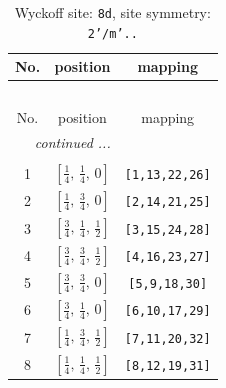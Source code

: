 \documentclass[fleqn,8pt]{jsarticle}
\begin{document}
\begin{longtable}{ccc}
\caption{Wyckoff site: {\tt 8d}, site symmetry: {\tt 2'/m'..}}
 \\
 \hline \hline
No. & position & mapping \\ \hline \endfirsthead

\multicolumn{2}{l}{\tablename\ \thetable{}} \\
 \hline \hline
No. & position & mapping \\ \hline \endhead

 \hline \hline
\multicolumn{2}{r}{\footnotesize\it continued ...} \\ \endfoot

 \hline \hline
\multicolumn{2}{r}{} \\ \endlastfoot

1 & $\left[ \frac{1}{4},\, \frac{1}{4},\, 0 \right]$ & {\tt [1,13,22,26]} \\ \hline
2 & $\left[ \frac{1}{4},\, \frac{3}{4},\, 0 \right]$ & {\tt [2,14,21,25]} \\ \hline
3 & $\left[ \frac{3}{4},\, \frac{1}{4},\, \frac{1}{2} \right]$ & {\tt [3,15,24,28]} \\ \hline
4 & $\left[ \frac{3}{4},\, \frac{3}{4},\, \frac{1}{2} \right]$ & {\tt [4,16,23,27]} \\ \hline
5 & $\left[ \frac{3}{4},\, \frac{3}{4},\, 0 \right]$ & {\tt [5,9,18,30]} \\ \hline
6 & $\left[ \frac{3}{4},\, \frac{1}{4},\, 0 \right]$ & {\tt [6,10,17,29]} \\ \hline
7 & $\left[ \frac{1}{4},\, \frac{3}{4},\, \frac{1}{2} \right]$ & {\tt [7,11,20,32]} \\ \hline
8 & $\left[ \frac{1}{4},\, \frac{1}{4},\, \frac{1}{2} \right]$ & {\tt [8,12,19,31]} \\
\end{longtable}
\renewcommand{\arraystretch}{1.2}
\end{document}
